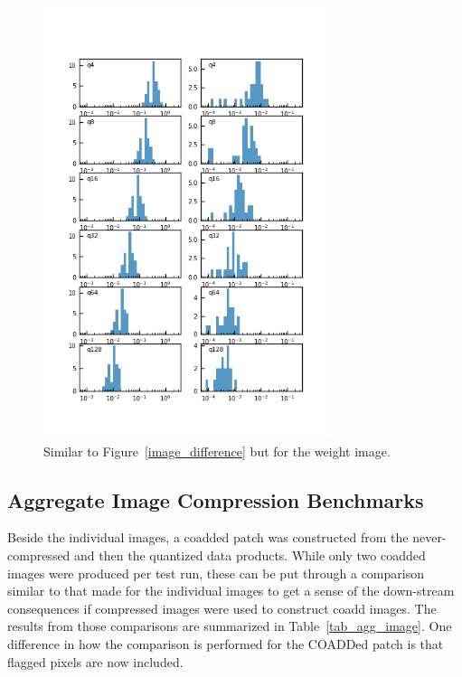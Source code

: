 \begin{figure}
\centering
\includegraphics[width=0.75\textwidth]{figure/compression_metric_v2w.png}
\caption{Similar to Figure~\ref{image_difference} but for the weight image.}
\label{weight_difference}
\end{figure}

\subsection{Aggregate Image Compression Benchmarks}

Beside the individual images, a coadded patch was constructed from the never-compressed and then the quantized data 
products.  While only two coadded images were produced per test run, these can be put through a comparison similar 
to that made for the individual images to get a sense of the down-stream consequences if compressed images were used
to construct coadd images.  The results from those comparisons are summarized in Table~\ref{tab_agg_image}.  One 
difference in how the comparison is performed for the COADDed patch is that flagged pixels are now included.


